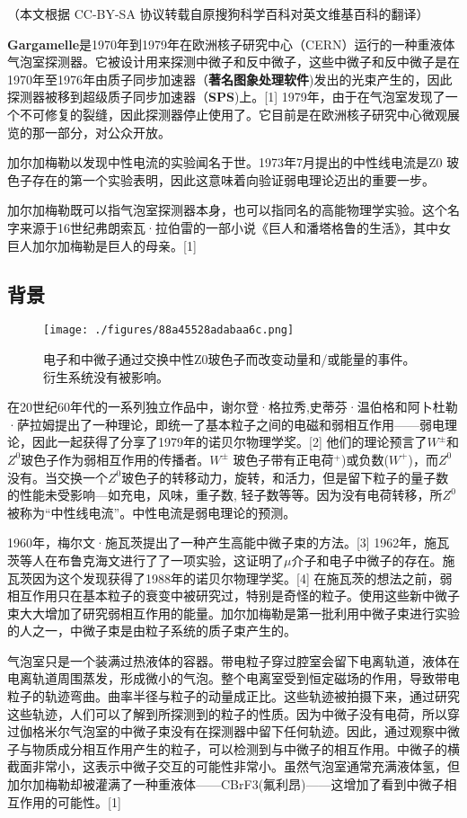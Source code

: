 
（本文根据 CC-BY-SA 协议转载自原搜狗科学百科对英文维基百科的翻译）

\textbf{Gargamelle}是1970年到1979年在欧洲核子研究中心（CERN）运行的一种重液体气泡室探测器。它被设计用来探测中微子和反中微子，这些中微子和反中微子是在1970年至1976年由质子同步加速器（\textbf{著名图象处理软件})发出的光束产生的，因此探测器被移到超级质子同步加速器（\textbf{SPS})上。[1] 1979年，由于在气泡室发现了一个不可修复的裂缝，因此探测器停止使用了。它目前是在欧洲核子研究中心微观展览的那一部分，对公众开放。

加尔加梅勒以发现中性电流的实验闻名于世。1973年7月提出的中性线电流是Z0 玻色子存在的第一个实验表明，因此这意味着向验证弱电理论迈出的重要一步。

加尔加梅勒既可以指气泡室探测器本身，也可以指同名的高能物理学实验。这个名字来源于16世纪弗朗索瓦·拉伯雷的一部小说《巨人和潘塔格鲁的生活》，其中女巨人加尔加梅勒是巨人的母亲。[1]

\subsection{背景}
\begin{figure}[ht]
\centering
\texttt{[image: ./figures/88a45528adabaa6c.png]}
\caption{电子和中微子通过交换中性Z0玻色子而改变动量和/或能量的事件。衍生系统没有被影响。} \label{fig_JRJML_1}
\end{figure}
在20世纪60年代的一系列独立作品中，谢尔登·格拉秀,史蒂芬·温伯格和阿卜杜勒·萨拉姆提出了一种理论，即统一了基本粒子之间的电磁和弱相互作用——弱电理论，因此一起获得了分享了1979年的诺贝尔物理学奖。[2] 他们的理论预言了$W^\pm$和$Z^0$玻色子作为弱相互作用的传播者。$W^\pm$ 玻色子带有正电荷$^+$)或负数($W^+$)，而$Z^0$没有。当交换一个$Z^0$玻色子的转移动力，旋转，和活力，但是留下粒子的量子数的性能未受影响—如充电，风味，重子数, 轻子数等等。因为没有电荷转移，所$Z^0$被称为“中性线电流”。中性电流是弱电理论的预测。

1960年，梅尔文·施瓦茨提出了一种产生高能中微子束的方法。[3] 1962年，施瓦茨等人在布鲁克海文进行了了一项实验，这证明了$\mu$介子和电子中微子的存在。施瓦茨因为这个发现获得了1988年的诺贝尔物理学奖。[4] 在施瓦茨的想法之前，弱相互作用只在基本粒子的衰变中被研究过，特别是奇怪的粒子。使用这些新中微子束大大增加了研究弱相互作用的能量。加尔加梅勒是第一批利用中微子束进行实验的人之一，中微子束是由粒子系统的质子束产生的。

气泡室只是一个装满过热液体的容器。带电粒子穿过腔室会留下电离轨道，液体在电离轨道周围蒸发，形成微小的气泡。整个电离室受到恒定磁场的作用，导致带电粒子的轨迹弯曲。曲率半径与粒子的动量成正比。这些轨迹被拍摄下来，通过研究这些轨迹，人们可以了解到所探测到的粒子的性质。因为中微子没有电荷，所以穿过伽格米尔气泡室的中微子束没有在探测器中留下任何轨迹。因此，通过观察中微子与物质成分相互作用产生的粒子，可以检测到与中微子的相互作用。中微子的横截面非常小，这表示中微子交互的可能性非常小。虽然气泡室通常充满液体氢，但加尔加梅勒却被灌满了一种重液体——CBrF3(氟利昂)——这增加了看到中微子相互作用的可能性。[1]

